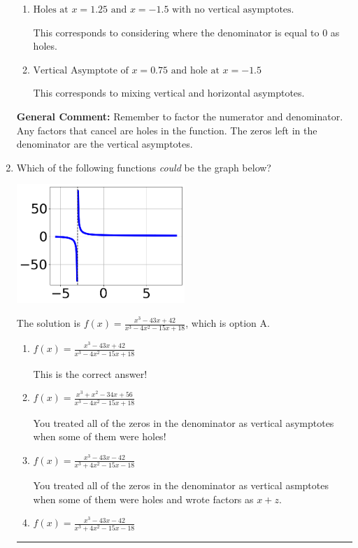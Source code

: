 \documentclass{extbook}[14pt]
\newcommand{\litem}[1]{\item #1

\rule{\textwidth}{0.4pt}}
\begin{document}
\begin{enumerate}
{\begin{enumerate}[label=\Alph*.]
This corresponds to setting the numerator equal to 0.
\item \( \text{Holes at } x = 1.25 \text{ and } x = -1.5 \text{ with no vertical asymptotes.} \)

This corresponds to considering where the denominator is equal to 0 as holes.
\item \( \text{Vertical Asymptote of } x = 0.75 \text{ and hole at } x = -1.5 \)

This corresponds to mixing vertical and horizontal asymptotes.
\end{enumerate}

\textbf{General Comment:} Remember to factor the numerator and denominator. Any factors that cancel are holes in the function. The zeros left in the denominator are the vertical asymptotes.
}
\litem{
Which of the following functions \textit{could} be the graph below?

\begin{center}
    \includegraphics[width=0.5\textwidth]{../Figures/identifyGraphOfRationalFunctionCopyC.png}
\end{center}


The solution is \( f(x)=\frac{x^{3} -43 x + 42}{x^{3} -4 x^{2} -15 x + 18} \), which is option A.\begin{enumerate}[label=\Alph*.]
\item \( f(x)=\frac{x^{3} -43 x + 42}{x^{3} -4 x^{2} -15 x + 18} \)

This is the correct answer!
\item \( f(x)=\frac{x^{3} + x^{2} -34 x + 56}{x^{3} -4 x^{2} -15 x + 18} \)

You treated all of the zeros in the denominator as vertical asymptotes when some of them were holes!
\item \( f(x)=\frac{x^{3} -43 x -42}{x^{3} +4 x^{2} -15 x -18} \)

You treated all of the zeros in the denominator as vertical asmptotes when some of them were holes and wrote factors as $x+z$.
\item \( f(x)=\frac{x^{3} -43 x -42}{x^{3} +4 x^{2} -15 x -18} \)


\end{enumerate}}
\end{enumerate}
\end{document}
